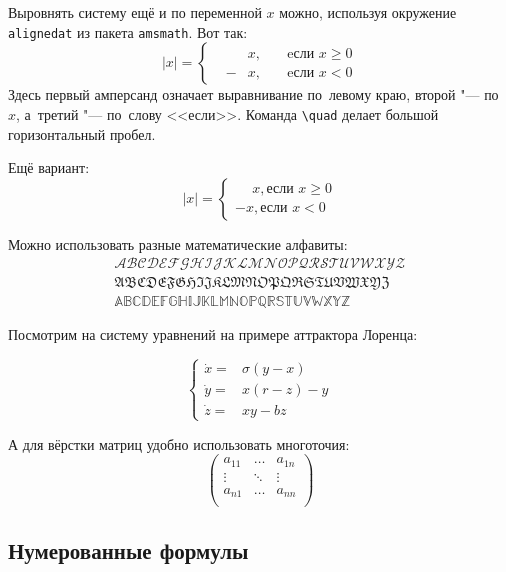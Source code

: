 Выровнять систему ещё и по переменной $ x $ можно, используя окружение \verb|alignedat| из пакета \verb|amsmath|. Вот так: 
\[
    |x| = \left\{
    \begin{alignedat}{2}
        &&x, \quad &\text{eсли } x\geqslant 0 \\
        &-&x, \quad & \text{eсли } x<0
    \end{alignedat}
    \right.
\]
Здесь первый амперсанд  означает выравнивание по~левому краю, второй "--- по~$ x $, а~третий "--- по~слову <<если>>. Команда \verb|\quad| делает большой горизонтальный пробел. 

Ещё вариант:
\[
    |x|=
    \begin{cases}
    \phantom{-}x, \text{если } x \geqslant 0 \\
    -x, \text{если } x<0
    \end{cases}
\]

Можно использовать разные математические алфавиты:
\begin{align}
\mathcal{ABCDEFGHIJKLMNOPQRSTUVWXYZ} \nonumber \\
\mathfrak{ABCDEFGHIJKLMNOPQRSTUVWXYZ} \nonumber \\
\mathbb{ABCDEFGHIJKLMNOPQRSTUVWXYZ} \nonumber
\end{align}

Посмотрим на систему уравнений на примере аттрактора Лоренца:

\[ 
\left\{
  \begin{array}{rl}
    \dot x = & \sigma (y-x) \\
    \dot y = & x (r - z) - y \\
    \dot z = & xy - bz
  \end{array}
\right.
\]

А для вёрстки матриц удобно использовать многоточия:
\[ 
\left(
  \begin{array}{ccc}
  	a_{11} & \ldots & a_{1n} \\
  	\vdots & \ddots & \vdots \\
  	a_{n1} & \ldots & a_{nn} \\
  \end{array}
\right)
\]


\subsection{Нумерованные формулы} \label{subsect1_3_3}

